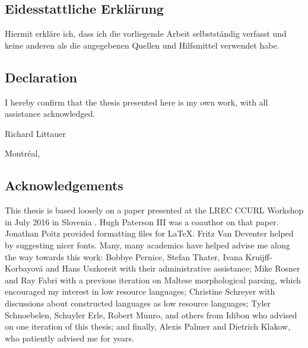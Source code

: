 \documentclass[12pt,a4paper]{article}
\begin{document}


\newpage

\thispagestyle{empty}
\noindent\subsection*{Eidesstattliche Erkl\"arung}

\noindent Hiermit erkl\"are ich, dass ich die vorliegende Arbeit selbstst\"andig verfasst und keine anderen als die angegebenen Quellen und Hilfsmittel verwendet habe.\\

\noindent\subsection*{Declaration}

\noindent I hereby confirm that the thesis presented here is my own work, with all assistance acknowledged. \\

\vspace{1cm}

\noindent Richard Littauer

\vspace{.5cm}

\noindent Montr\'eal, \thedate



\newpage


\noindent\subsection*{Acknowledgements}

\noindent This thesis is based loosely on a paper presented at the LREC CCURL Workshop in July 2016 in Slovenia \citep{CCURL}. Hugh Paterson III was a coauthor on that paper. Jonathan Poitz provided formatting files for \LaTeX. Fritz Van Deventer helped by suggesting nicer fonts. Many, many academics have helped advise me along the way towards this work: Bobbye Pernice, Stefan Thater, Ivana Kruijff-Korbayov\'a and Hans Uszkoreit with their administrative assistance; Mike Rosner and Ray Fabri with a previous iteration on Maltese morphological parsing, which encouraged my interest in low resource languages; Christine Schreyer with discussions about constructed languages as low resource languages; Tyler Schnoebelen, Schuyler Erle, Robert Munro, and others from Idibon who advised on one iteration of this thesis; and finally, Alexis Palmer and Dietrich Klakow, who patiently advised me for years.
\end{document}
